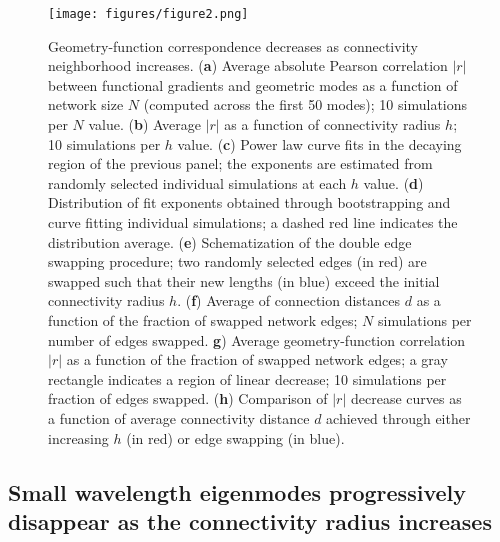 \documentclass{article}
\begin{document}
\begin{figure}[t]
    \centering
    \texttt{[image: figures/figure2.png]}
    \caption{Geometry-function correspondence decreases as connectivity neighborhood increases. (\textbf{a}) Average absolute Pearson correlation $|r|$ between functional gradients and geometric modes as a function of network size $N$ (computed across the first 50 modes); 10 simulations per $N$ value. (\textbf{b}) Average $|r|$ as a function of connectivity radius $h$; 10 simulations per $h$ value. (\textbf{c}) Power law curve fits in the decaying region of the previous panel; the exponents are estimated from randomly selected individual simulations at each $h$ value. (\textbf{d}) Distribution of fit exponents obtained through bootstrapping and curve fitting individual simulations; a dashed red line indicates the distribution average. (\textbf{e}) Schematization of the double edge swapping procedure; two randomly selected edges (in red) are swapped such that their new lengths (in blue) exceed the initial connectivity radius $h$. (\textbf{f}) Average of connection distances $d$ as a function of the fraction of swapped network edges; $N$ simulations per number of edges swapped. \textbf{g}) Average geometry-function correlation $|r|$ as a function of the fraction of swapped network edges; a gray rectangle indicates a region of linear decrease; 10 simulations per fraction of edges swapped. (\textbf{h}) Comparison of $|r|$ decrease curves as a function of average connectivity distance $d$ achieved through either increasing $h$ (in red) or edge swapping (in blue).}
    \label{fig2}
    \hrulefill
\end{figure}

\subsection*{Small wavelength eigenmodes progressively disappear as the connectivity radius increases}
\end{document}
